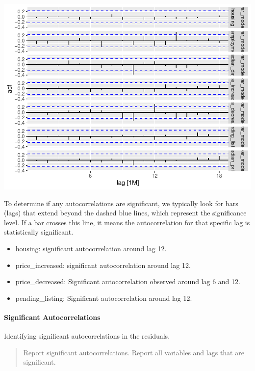 \documentclass[
]{article}
\begin{document}
\includegraphics{Montgomery_Rachel_Assignment6_files/figure-latex/unnamed-chunk-5-1.pdf}

To determine if any autocorrelations are significant, we typically look
for bars (lags) that extend beyond the dashed blue lines, which
represent the significance level. If a bar crosses this line, it means
the autocorrelation for that specific lag is statistically significant.

\begin{itemize}
\item
  housing: significant autocorrelation around lag 12.
\item
  price\_increased: significant autocorrelation around lag 12.
\item
  price\_decreased: Significant autocorrelation observed around lag 6
  and 12.
\item
  pending\_listing: Significant autocorrelation around lag 12.
\end{itemize}

\hypertarget{significant-autocorrelations}{%
\paragraph{Significant
Autocorrelations}\label{significant-autocorrelations}}

Identifying significant autocorrelations in the residuals.

\begin{quote}
Report significant autocorrelations. Report all variables and lags that
are significant.
\end{quote}
\end{document}
